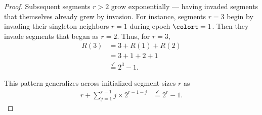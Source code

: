 \begin{proof}
Subsequent segments $r>2$ grow exponentially --- having invaded segments that themselves already grew by invasion.
For instance, segments $r=3$ begin by invading their singleton neighbors $r=1$ during epoch $\colort=1$.
Then they invade segments that began as $r=2$.
Thus, for $r=3$,
\begin{align*}
R(3)
&= 3 + R(1) + R(2)\\
&= 3 + 1 + 2 + 1\\
&\stackrel{\checkmark}{=} 2^3 - 1.
\end{align*}

This pattern generalizes across initialized segment sizes $r$ as
\begin{align*}
r + \sum_{j=1}^{r-1} j \times 2^{r-1-j}
&\stackrel{\checkmark}{=} 2^{r} - 1.
\end{align*}

\end{proof}



